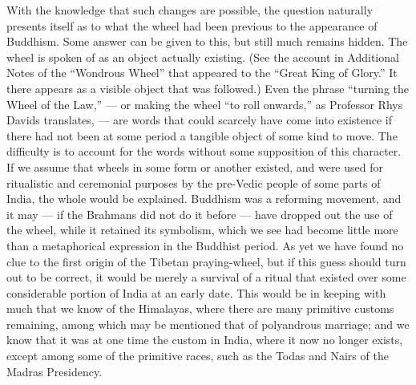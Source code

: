 \documentclass[a4paper, 11pt, oneside, polutonikogreek, english]{article}
\begin{document}
With the knowledge that such changes are possible, the question naturally presents itself as to what the wheel had been previous to the appearance of Buddhism. Some answer can be given to this, but still much remains hidden. The wheel is spoken of as an object actually existing. (See the account in Additional Notes of the ``Wondrous Wheel'' that appeared to the ``Great King of Glory.'' It there appears as a visible object that was followed.) Even the phrase ``turning the Wheel of the Law,'' --- or making the wheel ``to roll onwards,'' as Professor Rhys Davids translates, --- are words that could scarcely have come into existence if there had not been at some period a tangible object of some kind to move. The difficulty is to account for the words without some supposition of this character. If we assume that wheels in some form or another existed, and were used for ritualistic and ceremonial purposes by the pre-Vedic people of some parts of India, the whole would be explained. Buddhism was a reforming movement, and it may --- if the Brahmans did not do it before --- have dropped out the use of the wheel, while it retained its symbolism, which we see had become little more than a metaphorical expression in the Buddhist period. As yet we have found no clue to the first origin of the Tibetan praying-wheel, but if this guess should turn out to be correct, it would be merely a survival of a ritual that existed over some considerable portion of India at an early date. This would be in keeping with much that we know of the Himalayas, where there are many primitive customs remaining, among which may be mentioned that of polyandrous marriage; and we know that it was at one time the custom in India, where it now no longer exists, except among some of the primitive races, such as the Todas and Nairs of the Madras Presidency.
\end{document}
